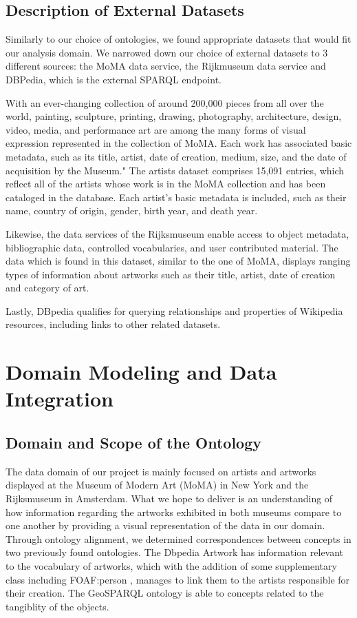 \documentclass{article}
\begin{document}
\subsection{Description of External Datasets}

Similarly to our choice of ontologies, we found appropriate datasets that would fit our analysis domain. We narrowed down our choice of external datasets to 3 different sources: the MoMA data service\cite{Moma}, the Rijkmuseum data service\cite{Rijks} and DBPedia, which is the external SPARQL endpoint\cite{Dbpedia}. 

With an ever-changing collection of around 200,000 pieces from all over the world, painting, sculpture, printing, drawing, photography, architecture, design, video, media, and performance art are among the many forms of visual expression represented in the collection of MoMA.
Each work has associated basic metadata, such as its title, artist, date of creation, medium, size, and the date of acquisition by the Museum." The artists dataset comprises 15,091 entries, which reflect all of the artists whose work is in the MoMA collection and has been cataloged in the database. Each artist's basic metadata is included, such as their name, country of origin, gender, birth year, and death year.

Likewise, the data services of the Rijksmuseum enable access to object metadata, bibliographic data, controlled vocabularies, and user contributed material. The data which is found in this dataset, similar to the one of MoMA, displays ranging types of information about artworks such as their title, artist, date of creation and category of art.

Lastly, DBpedia qualifies for querying relationships and properties of Wikipedia resources, including links to other related datasets.


\section{Domain Modeling and Data Integration}


\subsection{Domain and Scope of the Ontology}


The data domain of our project is mainly focused on artists and artworks displayed at the
Museum of Modern Art (MoMA) in New York and the Rijksmuseum in Amsterdam. What we
hope to deliver is an understanding of how information regarding the artworks exhibited in both
museums compare to one another by providing a visual representation of the data in our domain.
Through ontology alignment, we determined correspondences between concepts in two
previously found ontologies. The Dbpedia Artwork has information relevant to the vocabulary
of artworks, which with the addition of some supplementary class including FOAF:person , manages to link them
to the artists responsible for their creation. The GeoSPARQL ontology is able to concepts related to the tangiblity of the objects.
\end{document}
